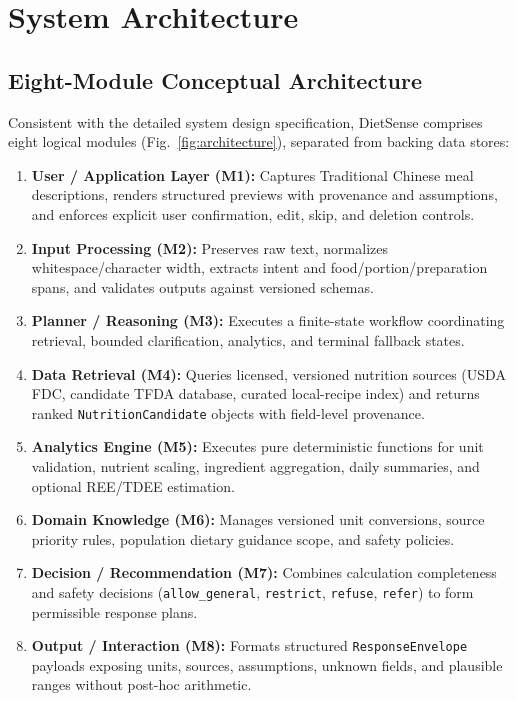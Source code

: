 \documentclass[conference]{IEEEtran}
\begin{document}
\section{System Architecture}
\subsection{Eight-Module Conceptual Architecture}
Consistent with the detailed system design specification, DietSense comprises eight logical modules (Fig.~\ref{fig:architecture}), separated from backing data stores:
\begin{enumerate}
    \item \textbf{User / Application Layer (M1):} Captures Traditional Chinese meal descriptions, renders structured previews with provenance and assumptions, and enforces explicit user confirmation, edit, skip, and deletion controls.
    \item \textbf{Input Processing (M2):} Preserves raw text, normalizes whitespace/character width, extracts intent and food/portion/preparation spans, and validates outputs against versioned schemas.
    \item \textbf{Planner / Reasoning (M3):} Executes a finite-state workflow coordinating retrieval, bounded clarification, analytics, and terminal fallback states.
    \item \textbf{Data Retrieval (M4):} Queries licensed, versioned nutrition sources (USDA FDC, candidate TFDA database, curated local-recipe index) and returns ranked \texttt{NutritionCandidate} objects with field-level provenance.
    \item \textbf{Analytics Engine (M5):} Executes pure deterministic functions for unit validation, nutrient scaling, ingredient aggregation, daily summaries, and optional REE/TDEE estimation.
    \item \textbf{Domain Knowledge (M6):} Manages versioned unit conversions, source priority rules, population dietary guidance scope, and safety policies.
    \item \textbf{Decision / Recommendation (M7):} Combines calculation completeness and safety decisions (\texttt{allow\_general}, \texttt{restrict}, \texttt{refuse}, \texttt{refer}) to form permissible response plans.
    \item \textbf{Output / Interaction (M8):} Formats structured \texttt{ResponseEnvelope} payloads exposing units, sources, assumptions, unknown fields, and plausible ranges without post-hoc arithmetic.
\end{enumerate}
\end{document}
